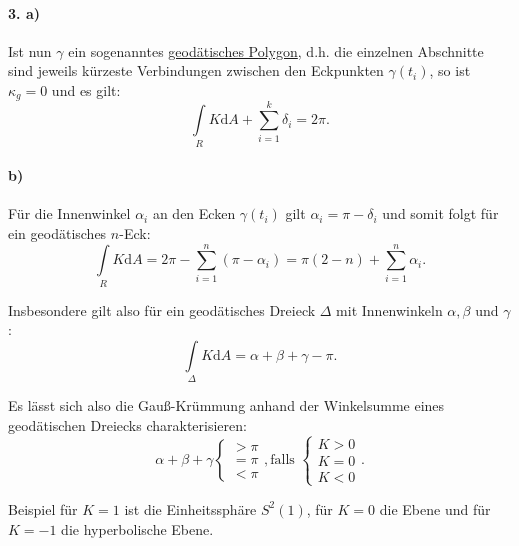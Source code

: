 \documentclass[a4paper,11pt,notitlepage]{report}
\theoremstyle{definition}
\begin{document}
\begin{enumerate}
\paragraph{3. a)} Ist nun $\gamma$ ein sogenanntes \underline{geodätisches Polygon}, d.h. die einzelnen Abschnitte sind jeweils kürzeste Verbindungen zwischen den Eckpunkten $\gamma(t_i)$, so ist $\kappa_g=0$ und es gilt:
$$\int\limits_R K \mathrm{d}A + \sum\limits_{i=1}^k{\delta_i} = 2 \pi.$$

\paragraph{b)} Für die Innenwinkel $\alpha_i$ an den Ecken $\gamma(t_i)$ gilt $\alpha_i = \pi - \delta_i$ und somit folgt für ein geodätisches $n$-Eck:
$$\int\limits_{R} K \mathrm{d}A = 2 \pi - \sum\limits_{i=1}^n{(\pi - \alpha_i)} = \pi(2-n) + \sum\limits_{i=1}^n{\alpha_i}.$$

Insbesondere gilt also für ein geodätisches Dreieck $\Delta$ mit Innenwinkeln $\alpha, \beta$ und $\gamma$:
$$\int\limits_\Delta{K \mathrm{d}A} = \alpha + \beta + \gamma - \pi.$$

Es lässt sich also die Gauß-Krümmung anhand der Winkelsumme eines geodätischen Dreiecks charakterisieren:
$$\alpha + \beta + \gamma \begin{cases} > \pi \\ = \pi \\ < \pi \end{cases}, \text{falls } \begin{cases} K > 0 \\ K = 0 \\ K < 0 \end{cases}.$$

Beispiel für $K=1$ ist die Einheitssphäre $S^2(1)$, für $K=0$ die Ebene und für $K=-1$ die hyperbolische Ebene.

\end{enumerate}
\end{document}
